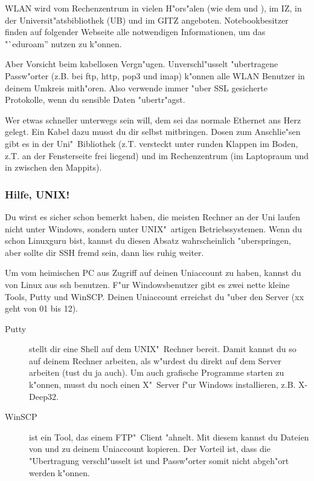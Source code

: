 WLAN wird vom Rechenzentrum in vielen H"ors"alen (wie dem  und
), im IZ, in der Universit"atsbibliothek (UB) und im GITZ angeboten.
Notebookbesitzer finden auf folgender Webseite alle notwendigen Informationen, um das "`eduroam'' nutzen zu k"onnen.
\par

Aber Vorsicht beim kabellosen Vergn"ugen. Unverschl"usselt "ubertragene
Passw"orter (z.B. bei ftp, http, pop3 und imap) k"onnen alle WLAN
Benutzer in deinem Umkreis mith"oren. Also verwende immer "uber SSL
gesicherte Protokolle, wenn du sensible Daten "ubertr"agst.

Wer etwas schneller unterwegs sein will, dem sei das normale Ethernet ans
Herz gelegt. Ein Kabel dazu musst du dir selbst mitbringen. Dosen zum
Anschlie"sen gibt es in der Uni"~Bibliothek (z.T. versteckt unter runden
Klappen im Boden, z.T. an der Fensterseite frei liegend) und im
Rechenzentrum (im Laptopraum  und in  zwischen den
Mappits).

\subsubsection{Hilfe, UNIX!}
Du wirst es sicher schon bemerkt haben, die meisten Rechner an der Uni
laufen nicht unter Windows, sondern unter UNIX"~artigen Betriebssystemen.
Wenn du schon Linuxguru bist, kannst du diesen Absatz wahrscheinlich
"uberspringen, aber sollte dir SSH fremd sein, dann lies ruhig
weiter.\par
Um vom heimischen PC aus Zugriff auf deinen Uniaccount zu haben, kannst
du von Linux aus ssh benutzen. F"ur Windowsbenutzer gibt es zwei nette
kleine Tools, Putty und WinSCP. Deinen Uniaccount erreichst du "uber
den Server  (xx geht von 01 bis 12).

\begin{description}
\item[Putty] stellt dir eine Shell auf dem UNIX"~Rechner bereit. Damit
kannst du so auf deinem Rechner arbeiten, als w"urdest du direkt auf
dem Server arbeiten (tust du ja auch). Um auch grafische Programme
starten zu k"onnen, musst du noch einen X"~Server f"ur Windows installieren,
z.B. X-Deep32.
\item[WinSCP] ist ein Tool, das einem FTP"~Client "ahnelt. Mit diesem
kannst du Dateien von und zu deinem Uniaccount kopieren. Der Vorteil
ist, dass die "Ubertragung verschl"usselt ist und Passw"orter somit
nicht abgeh"ort werden k"onnen.
\end{description}


